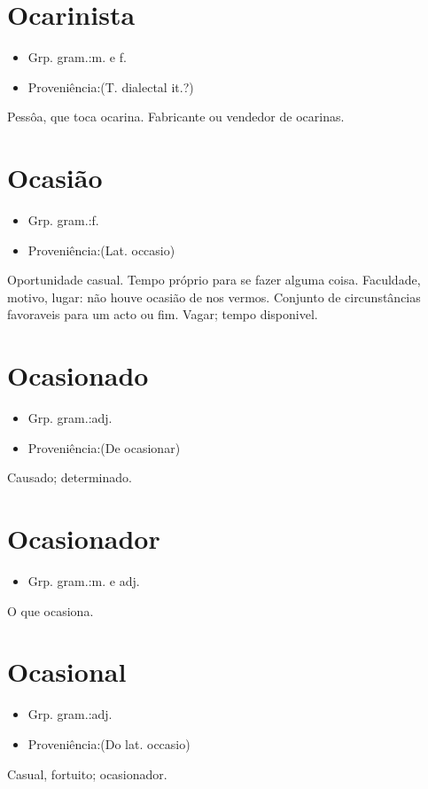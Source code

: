 \section{Ocarinista}
\begin{itemize}
\item {Grp. gram.:m.  e  f.}
\end{itemize}
\begin{itemize}
\item {Proveniência:(T. dialectal it.?)}
\end{itemize}
Pessôa, que toca ocarina.
Fabricante ou vendedor de ocarinas.
\section{Ocasião}
\begin{itemize}
\item {Grp. gram.:f.}
\end{itemize}
\begin{itemize}
\item {Proveniência:(Lat. \textunderscore occasio\textunderscore )}
\end{itemize}
Oportunidade casual.
Tempo próprio para se fazer alguma coisa.
Faculdade, motivo, lugar: \textunderscore não houve ocasião de nos vermos\textunderscore .
Conjunto de circunstâncias favoraveis para um acto ou fim.
Vagar; tempo disponivel.
\section{Ocasionado}
\begin{itemize}
\item {Grp. gram.:adj.}
\end{itemize}
\begin{itemize}
\item {Proveniência:(De \textunderscore ocasionar\textunderscore )}
\end{itemize}
Causado; determinado.
\section{Ocasionador}
\begin{itemize}
\item {Grp. gram.:m.  e  adj.}
\end{itemize}
O que ocasiona.
\section{Ocasional}
\begin{itemize}
\item {Grp. gram.:adj.}
\end{itemize}
\begin{itemize}
\item {Proveniência:(Do lat. \textunderscore occasio\textunderscore )}
\end{itemize}
Casual, fortuito; ocasionador.
